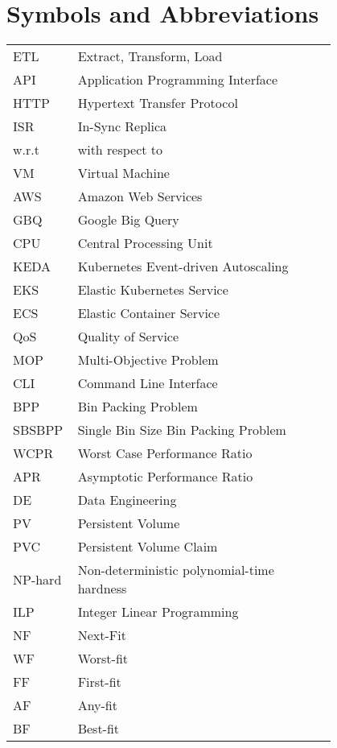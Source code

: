 \chapter*{Symbols and Abbreviations}

\begin{flushleft}
\begin{longtable}{l p{0.8\linewidth}}
ETL      & Extract, Transform, Load\\
API      & Application Programming Interface\\
HTTP     & Hypertext Transfer Protocol \\
ISR      & In-Sync Replica\\
w.r.t    & with respect to\\
VM       & Virtual Machine\\
AWS      & Amazon Web Services\\
GBQ      & Google Big Query\\
CPU      & Central Processing Unit\\
KEDA     & Kubernetes Event-driven Autoscaling\\
EKS      & Elastic Kubernetes Service\\
ECS      & Elastic Container Service\\
QoS      & Quality of Service\\
MOP      & Multi-Objective Problem\\
CLI      & Command Line Interface\\
BPP      & Bin Packing Problem\\
SBSBPP   & Single Bin Size Bin Packing Problem\\
WCPR     & Worst Case Performance Ratio\\
APR      & Asymptotic Performance Ratio\\
DE       & Data Engineering \\
PV       & Persistent Volume \\
PVC      & Persistent Volume Claim \\
NP-hard  & Non-deterministic polynomial-time hardness \\
ILP      & Integer Linear Programming \\
NF       & Next-Fit \\
WF       & Worst-fit \\
FF       & First-fit \\
AF       & Any-fit \\
BF       & Best-fit \\

\end{longtable}
\end{flushleft}
